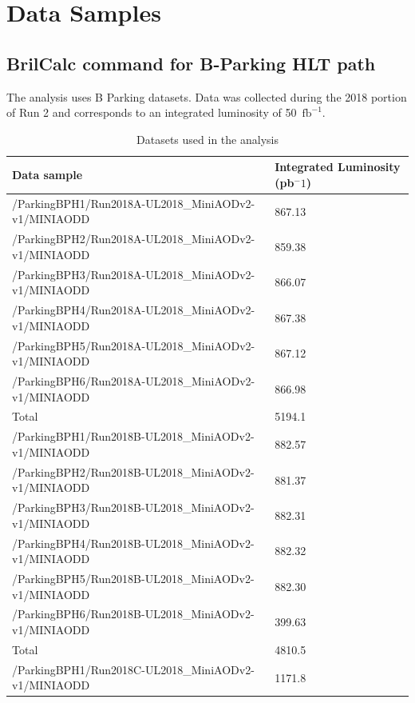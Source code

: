 \chapter{Data Samples}

\section{BrilCalc command for B-Parking HLT path}\label{sec:PU}
The analysis uses B Parking datasets. Data was
collected during the 2018 portion of Run 2 and corresponds to an integrated luminosity of
 50~$\mathrm{fb}^{-1}$.

\begin{table}[htb!]
  \caption{Datasets used in the analysis}
  \begin{center}
    \begin{tabular}{l|l}\hline
      Data sample & Integrated Luminosity (pb$^-1$)\\
      \hline
      /ParkingBPH1/Run2018A-UL2018\_MiniAODv2-v1/MINIAODD  & 867.13 \\
      /ParkingBPH2/Run2018A-UL2018\_MiniAODv2-v1/MINIAODD  & 859.38 \\
      /ParkingBPH3/Run2018A-UL2018\_MiniAODv2-v1/MINIAODD  & 866.07 \\
      /ParkingBPH4/Run2018A-UL2018\_MiniAODv2-v1/MINIAODD  & 867.38 \\
      /ParkingBPH5/Run2018A-UL2018\_MiniAODv2-v1/MINIAODD  & 867.12 \\
      /ParkingBPH6/Run2018A-UL2018\_MiniAODv2-v1/MINIAODD  & 866.98 \\
      Total & 5194.1\\
      \hline
      /ParkingBPH1/Run2018B-UL2018\_MiniAODv2-v1/MINIAODD  & 882.57 \\
      /ParkingBPH2/Run2018B-UL2018\_MiniAODv2-v1/MINIAODD  & 881.37 \\
      /ParkingBPH3/Run2018B-UL2018\_MiniAODv2-v1/MINIAODD  & 882.31 \\
      /ParkingBPH4/Run2018B-UL2018\_MiniAODv2-v1/MINIAODD  & 882.32 \\
      /ParkingBPH5/Run2018B-UL2018\_MiniAODv2-v1/MINIAODD  & 882.30 \\
      /ParkingBPH6/Run2018B-UL2018\_MiniAODv2-v1/MINIAODD  & 399.63 \\
      Total & 4810.5\\
      \hline
      /ParkingBPH1/Run2018C-UL2018\_MiniAODv2-v1/MINIAODD  & 1171.8 \\

\end{tabular}
\end{center}
\end{table}

